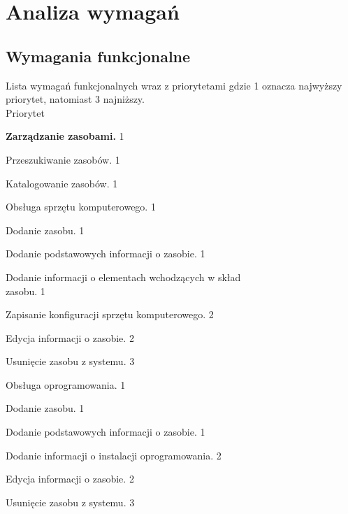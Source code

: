\section{Analiza wymagań}

\subsection{Wymagania funkcjonalne}
Lista wymagań funkcjonalnych wraz z priorytetami gdzie 1 oznacza najwyższy priorytet, natomiast 3 najniższy. \\

\hfill Priorytet
\begin{myEnumerate}
\item\label{f1} \textbf{Zarządzanie zasobami.} 
\hfill 1
	\begin{myEnumerate}
	\item\label{f2} Przeszukiwanie zasobów. 
	\hfill 1
	\item\label{f3} Katalogowanie zasobów. 
	\hfill 1
	\begin{myEnumerate}

	\item\label{f4} Obsługa sprzętu komputerowego. 
	\hfill 1
	\begin{myEnumerate}
		\item\label{f5} Dodanie zasobu. 
		\hfill 1
		\begin{myEnumerate}
		\item\label{f6} Dodanie podstawowych informacji o zasobie.
		 \hfill 1
		\item\label{f7} Dodanie informacji o elementach wchodzących w skład \\  zasobu. 
		\hfill 1
		\item\label{f8} Zapisanie konfiguracji sprzętu komputerowego. 
		\hfill 2
		\end{myEnumerate}
		\item\label{f9} Edycja informacji o zasobie. 
		\hfill 2
		\item\label{f10} Usunięcie zasobu z systemu. 
		\hfill 3
	\end{myEnumerate}

	\item\label{f11} Obsługa oprogramowania. 
	\hfill 1

	\begin{myEnumerate}
		\item\label{f12} Dodanie zasobu. 
		\hfill 1
		\begin{myEnumerate}
			\item\label{f13} Dodanie podstawowych informacji o zasobie. 
			\hfill 1
			\item\label{f14} Dodanie informacji o instalacji oprogramowania. 
			\hfill 2
		\end{myEnumerate}
		\item\label{f15} Edycja informacji o zasobie. 
		\hfill 2
		\item\label{f16} Usunięcie zasobu z systemu. 
		\hfill 3
	\end{myEnumerate}


\end{myEnumerate}
\end{myEnumerate}
\end{myEnumerate}

